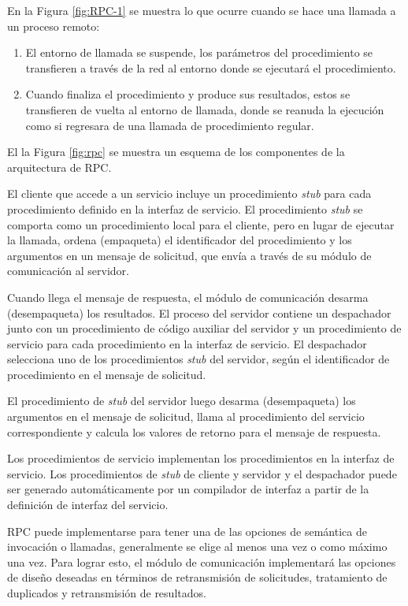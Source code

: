 En la Figura \ref{fig:RPC-1} se muestra lo que ocurre cuando se hace una llamada a un proceso remoto:
\begin{enumerate}
	\item El entorno de llamada se suspende, los parámetros del procedimiento se transfieren a través de la red al entorno donde se ejecutará el procedimiento.
	\item Cuando finaliza el procedimiento y produce sus resultados, estos se transfieren de vuelta al entorno de llamada, donde se reanuda la ejecución como si regresara de una llamada de procedimiento regular.
	
\end{enumerate}

El la Figura \ref{fig:rpc} se muestra un esquema de los componentes de la arquitectura de RPC.

El cliente que accede a un servicio incluye un procedimiento \textit{stub} para cada procedimiento definido en la interfaz de servicio. El procedimiento \textit{stub} se comporta como un procedimiento local para el cliente, pero en lugar de ejecutar la llamada, ordena (empaqueta) el identificador del procedimiento y los argumentos en un mensaje de solicitud, que envía a través de su módulo de comunicación al servidor. 

Cuando llega el mensaje de respuesta, el  módulo de comunicación  desarma (desempaqueta) los resultados. El proceso del servidor contiene un despachador junto con un procedimiento de código auxiliar del servidor y un procedimiento de servicio para cada procedimiento en la interfaz de servicio. El despachador selecciona uno de los procedimientos \textit{stub}  del servidor, según el identificador de procedimiento en el mensaje de solicitud. 

El procedimiento de \textit{stub} del servidor luego  desarma (desempaqueta)  los argumentos en el mensaje de solicitud, llama al procedimiento del servicio correspondiente  y calcula los valores de retorno para el mensaje de respuesta. 

Los procedimientos de servicio implementan los procedimientos en la interfaz de servicio. Los procedimientos de \textit{stub} de cliente y servidor y el despachador puede ser generado automáticamente por un compilador de interfaz a partir de la definición de interfaz del servicio.

 RPC puede implementarse para tener una de las opciones de semántica de invocación o llamadas, generalmente se elige al menos una vez o como máximo una vez. Para lograr esto, el módulo de comunicación implementará las opciones de diseño deseadas en términos de retransmisión de solicitudes, tratamiento de duplicados y retransmisión de resultados.


